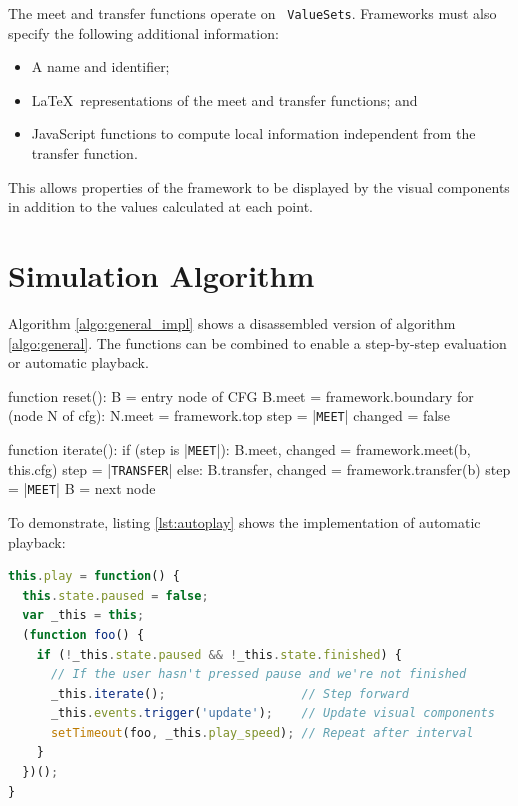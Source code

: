 \documentclass[bsc,twoside,singlespacing,parskip,logo,notimes,normalheadings]{infthesis}
\begin{document}
    The meet and transfer functions operate on {\tt
      ValueSets}. Frameworks must also specify the following additional
    information:

    \begin{itemize}
    \item A name and identifier;
    \item \LaTeX\ representations of the \gls{meet} and \gls{transfer} functions; and
    \item JavaScript functions to compute local information
      independent from the \gls{transfer} function.
    \end{itemize}

    This allows properties of the framework to be displayed by the
    visual components in addition to the values calculated at each
    point.
    
    \section{Simulation Algorithm}
    Algorithm \ref{algo:general_impl} shows a disassembled version of
    algorithm \ref{algo:general}. The functions can be combined to
    enable a step-by-step evaluation or automatic playback.

    \begin{algorithm}[caption={Implementation of General Framework Algorithm}, label={algo:general_impl},escapeinside={||},mathescape=true]
function reset():
    B = entry node of CFG
    B.meet = framework.boundary
    for (node N of cfg):
        N.meet = framework.top
    step    = |{\tt MEET}|
    changed = false

function iterate():
    if (step is |{\tt MEET}|):
        B.meet, changed = framework.meet(b, this.cfg)
        step = |{\tt TRANSFER}|
    else:
        B.transfer, changed = framework.transfer(b)
        step = |{\tt MEET}|
        B    = next node
    \end{algorithm}

    To demonstrate, listing \ref{lst:autoplay} shows the implementation of
    automatic playback:

    \begin{lstlisting}[language=JavaScript, caption={JavaScript Implementation of Automatic Playback}, label={lst:autoplay}]
this.play = function() {
  this.state.paused = false;
  var _this = this;
  (function foo() {
    if (!_this.state.paused && !_this.state.finished) {
      // If the user hasn't pressed pause and we're not finished
      _this.iterate();                   // Step forward
      _this.events.trigger('update');    // Update visual components
      setTimeout(foo, _this.play_speed); // Repeat after interval
    }
  })();
}
    \end{lstlisting}
    
\end{document}
